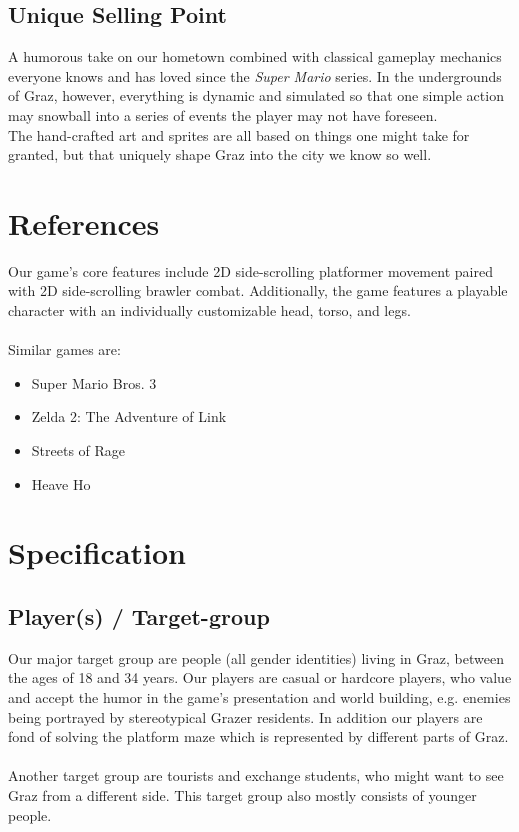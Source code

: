 \documentclass[a4paper]{scrreprt}
\begin{document}
\section{Unique Selling Point}
A humorous take on our hometown combined with classical gameplay mechanics everyone knows and has loved since the \textit{Super Mario} series. In the undergrounds of Graz, however, everything is dynamic and simulated so that one simple action may snowball into a series of events the player may not have foreseen. 
\\ The hand-crafted art and sprites are all based on things one might take for granted, but that uniquely shape Graz into the city we know so well.



\chapter{References} 
Our game's core features include 2D side-scrolling platformer movement paired with 2D side-scrolling brawler combat. Additionally, the game features a playable character with an individually customizable head, torso, and legs. \\ \\
Similar games are:

\begin{itemize}
\item Super Mario Bros. 3
\item Zelda 2: The Adventure of Link
\item Streets of Rage
\item Heave Ho
\end{itemize}



\chapter{Specification}

\section{Player(s) / Target-group}
Our major target group are people (all gender identities) living in Graz, between the ages of 18 and 34 years. Our players are casual or hardcore players, who value and accept the humor in the game's presentation and world building, e.g. enemies being portrayed by stereotypical Grazer residents. In addition our players are fond of solving the platform maze which is represented by different parts of Graz. \\\\
Another target group are tourists and exchange students, who might want to see Graz from a different side. This target group also mostly consists of younger people.
\end{document}
